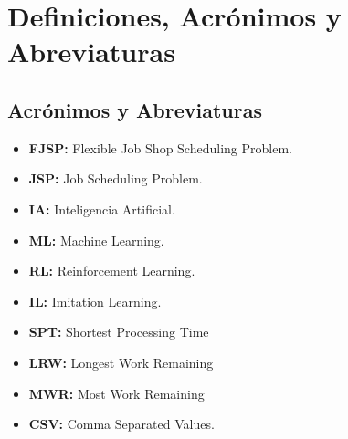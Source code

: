 \section{Definiciones, Acrónimos y Abreviaturas}
\subsection{Acrónimos y Abreviaturas}
\begin{itemize}
    \item \textbf{FJSP: } Flexible Job Shop Scheduling Problem.
    \item \textbf{JSP: } Job Scheduling Problem.
    \item \textbf{IA: } Inteligencia Artificial.
    \item \textbf{ML: } Machine Learning.
    \item \textbf{RL: } Reinforcement Learning.
    \item \textbf{IL: } Imitation Learning.
    \item \textbf{SPT:} Shortest Processing Time
    \item \textbf{LRW:} Longest Work Remaining
    \item \textbf{MWR:} Most Work Remaining
    \item \textbf{CSV: } Comma Separated Values.
\end{itemize}

